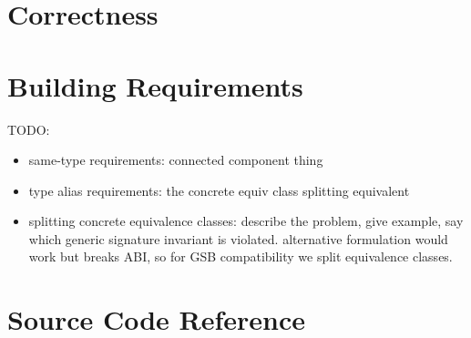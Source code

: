 \documentclass[../generics]{subfiles}
\begin{document}
\section{Correctness}\label{minimization correctness}

\section{Building Requirements}\label{requirement builder}


\ifWIP
TODO:
\begin{itemize}
\item same-type requirements: connected component thing
\item type alias requirements: the concrete equiv class splitting equivalent
\item splitting concrete equivalence classes: describe the problem, give example, say which generic signature invariant is violated. alternative formulation would work but breaks ABI, so for GSB compatibility we split equivalence classes.
\end{itemize}
\fi

\section{Source Code Reference}\label{rqm minimization source ref}
\end{document}
